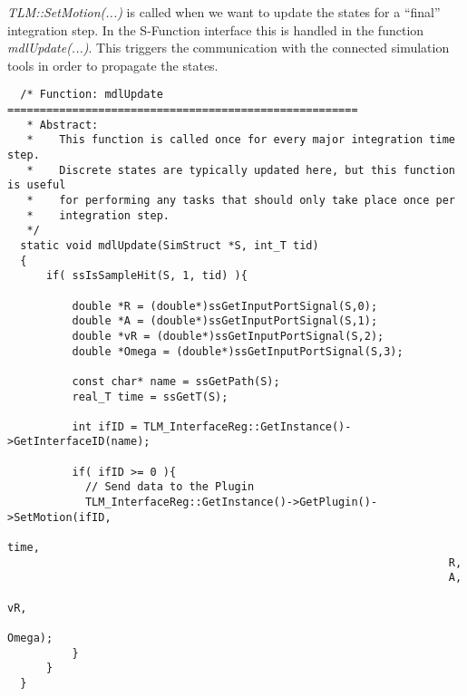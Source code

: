 {\em TLM::SetMotion(...)} is called when we want to update the states for a ``final'' integration step. In the S-Function interface this is handled in the function {\em mdlUpdate(...)}. 
This triggers the communication with the connected simulation tools in order to propagate the states.

{\scriptsize
\begin{verbatim}
  /* Function: mdlUpdate ======================================================
   * Abstract:
   *    This function is called once for every major integration time step.
   *    Discrete states are typically updated here, but this function is useful
   *    for performing any tasks that should only take place once per
   *    integration step.
   */
  static void mdlUpdate(SimStruct *S, int_T tid)
  {
      if( ssIsSampleHit(S, 1, tid) ){

          double *R = (double*)ssGetInputPortSignal(S,0);
          double *A = (double*)ssGetInputPortSignal(S,1);
          double *vR = (double*)ssGetInputPortSignal(S,2);
          double *Omega = (double*)ssGetInputPortSignal(S,3);

          const char* name = ssGetPath(S);
          real_T time = ssGetT(S);

          int ifID = TLM_InterfaceReg::GetInstance()->GetInterfaceID(name);

          if( ifID >= 0 ){
            // Send data to the Plugin
            TLM_InterfaceReg::GetInstance()->GetPlugin()->SetMotion(ifID,
                                                                    time,
                                                                    R,
                                                                    A,
                                                                    vR,
                                                                    Omega);
          }
      }
  }
\end{verbatim}
} 